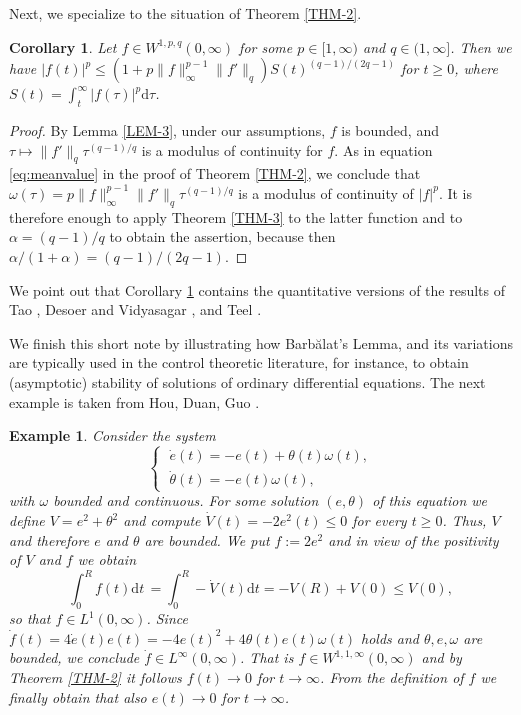 \documentclass[10pt, a4paper, reqno]{amsart}
\theoremstyle{normal}
\newtheorem{ex}[thm]{Example}
\newtheorem{cor}[thm]{Corollary}
\newcommand{\dd}{\mathrm{d}}
\begin{document}
\smallskip

Next, we specialize to the situation of Theorem \ref{THM-2}.

\smallskip

\begin{cor}\label{COR-1} Let $f\in W^{1,p,q}(0,\infty)$ for some $p\in [1,\infty)$ and $q\in (1,\infty]$. Then we have $|f(t)|^p\leqslant(1+p\|f\|^{p-1}_{\infty}\|f'\|_{q})S(t)^{(q-1)/(2q-1)}$ for $t\geqslant0$, where $S(t)=\int_t^{\infty}|f(\tau)|^p\dd\tau$.
\end{cor}

\begin{proof} By Lemma \ref{LEM-3}, under our assumptions, $f$ is bounded, and $\tau\mapsto \|f'\|_{q}\tau^{(q-1)/q}$ is a modulus of continuity for $f$. As in equation \eqref{eq:meanvalue} in the proof of Theorem \ref{THM-2}, we conclude that $\omega(\tau)=p\|f\|_\infty^{p-1}\|f'\|_{q}\tau^{(q-1)/q}$ is a modulus of continuity of $|f|^p$. It is therefore enough to apply Theorem \ref{THM-3} to the latter function and to $\alpha={(q-1)}/{q}$ to obtain the assertion, because then $\alpha/(1+\alpha)=(q-1)/(2q-1)$.
\end{proof}

\smallskip

We point out that Corollary \ref{COR-1} contains the quantitative versions of the results of Tao \cite[Lemma 1]{Tao}, Desoer and Vidyasagar \cite[Ex.~1 on p.~237]{DV}, and Teel \cite[Fact 4]{Teel}.

\bigskip

We finish this short note by illustrating how Barb\u{a}lat's Lemma, and its variations are typically used in the control theoretic literature, for instance, to obtain (asymptotic) stability of solutions of ordinary differential equations. The next example is taken from Hou, Duan, Guo \cite[Example 3.1]{HDG}.
%
\smallskip
%
\begin{ex}\label{EX} Consider the system
$$
\begin{cases}
\; \dot{e}(t) = -e(t)+\theta(t)\omega(t),\\
\; \dot{\theta}(t) = -e(t)\omega(t),
\end{cases}
$$
with $\omega$ bounded and continuous. For some solution $(e,\theta)$ of this equation we define $V=e^2+\theta^2$ and compute $\dot{V}(t)=-2e^2(t)\leqslant0$ for every $t\geqslant0$. Thus, $V$ and therefore $e$ and $\theta$ are bounded. We put $f:=2e^2$ and in view of the positivity of $V$ and $f$ we obtain
$$
\int_0^Rf(t)\dd{}t \, = \int_0^R-\dot{V}(t)\dd{}t = -V(R)+V(0)\leqslant V(0),
$$
so that $f\in L^1(0,\infty)$.  Since  $\dot{f}(t)=4\dot{e}(t)e(t)=-4e(t)^2+4\theta(t)e(t)\omega(t)$ holds and $\theta,e,\omega$ are bounded, we conclude $\dot{f}\in L^{\infty}(0,\infty)$. That is $f\in W^{1,1,\infty}(0,\infty)$ and by Theorem \ref{THM-2} it follows $f(t)\rightarrow0$ for $t\rightarrow\infty$. From the definition of $f$ we finally obtain that also $e(t)\rightarrow0$ for $t\rightarrow\infty$.
\end{ex}
\end{document}
